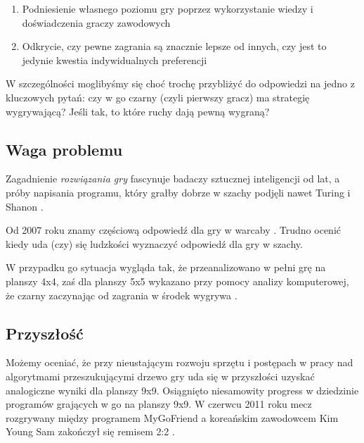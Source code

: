 \documentclass[11pt,leqno]{article}
\begin{document}
\begin{enumerate}
\item Podniesienie własnego poziomu gry poprzez wykorzystanie wiedzy i doświadczenia graczy zawodowych
\item Odkrycie, czy pewne zagrania są znacznie lepsze od innych, czy jest to jedynie kwestia indywidualnych preferencji
\end{enumerate}

W szczególności moglibyśmy się choć trochę przybliżyć do odpowiedzi na jedno z kluczowych pytań: czy w go czarny
 (czyli pierwszy gracz) ma strategię wygrywającą? Jeśli tak, to które ruchy dają pewną wygraną?

\subsection{Waga problemu}

Zagadnienie \emph{rozwiązania gry} fascynuje badaczy sztucznej inteligencji od lat,
 a próby napisania programu, który grałby dobrze w szachy podjęli nawet Turing i Shanon \cite{ai}.

Od 2007 roku znamy częściową  odpowiedź dla gry w warcaby \cite{checkers}. Trudno ocenić kiedy uda (czy) się ludzkości wyznaczyć odpowiedź dla gry w szachy. 

W przypadku go sytuacja wygląda tak, że przeanalizowano w pełni grę na planszy 4x4, 
zaś dla planszy 5x5 wykazano przy pomocy analizy komputerowej, że czarny zaczynając od zagrania w środek wygrywa \cite{gofive}. 

\subsection{Przyszłość}

Możemy oceniać, że przy nieustającym rozwoju sprzętu i postępach w pracy nad  algorytmami przeszukującymi drzewo
gry uda się w przyszłości uzyskać analogiczne wyniki dla planszy 9x9. Osiągnięto niesamowity progress w dziedzinie 
programów grających w go na planszy 9x9. W czerwcu 2011 roku mecz rozgrywany
między programem MyGoFriend a koreańskim zawodowcem Kim Young Sam zakończył się remisem 2:2 \cite{promatch}.
\end{document}
